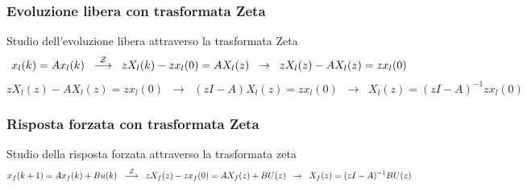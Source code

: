 \subsubsection*{Evoluzione libera con trasformata Zeta}
Studio dell'evoluzione libera attraverso la trasformata Zeta
\[x_l(k) = Ax_l(k) \;\;\stackrel{\mathcal{Z}}{\longrightarrow}\;\; zX_l(k) - zx_l(0) = AX_l(z) \;\;\rightarrow\;\; zX_l(z)-AX_l(z) = zx_l(0)\]
\[zX_l(z)-AX_l(z) = zx_l(0) \;\;\rightarrow\;\; (zI-A)X_l(z) = zx_l(0) \;\;\rightarrow\;\; X_l(z) = (zI-A)^{-1} zx_l(0)\]

\subsubsection*{Risposta forzata con trasformata Zeta}
Studio della risposta forzata attraverso la trasformata zeta
\[x_f(k+1) = Ax_f(k) + Bu(k) \;\;\stackrel{\mathcal{Z}}{\longrightarrow}\;\; zX_f(z) - zx_f(0) = AX_f(z) + BU(z) \;\;\rightarrow\;\; X_f(z) = (zI-A)^{-1}BU(z)\]
